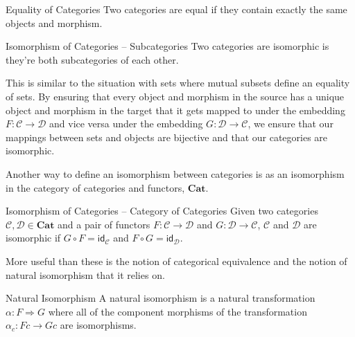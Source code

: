 \documentclass[12pt]{article}
\begin{document}
\begin{definition}{Equality of Categories}{}
    Two categories are equal if they contain exactly the same objects and morphism.
\end{definition}

\begin{definition}{Isomorphism of Categories -- Subcategories}{}
    Two categories are isomorphic is they're both subcategories of each other.
\end{definition}
This is similar to the situation with sets where mutual subsets define an equality of sets.
By ensuring that every object and morphism in the source has a unique object and morphism in the target that it gets mapped to under the embedding $F:\mathcal{C} \rightarrow \mathcal{D}$ and vice versa under the embedding $G:\mathcal{D} \rightarrow \mathcal{C}$,
we ensure that our mappings between sets and objects are bijective and that our categories are isomorphic.

Another way to define an isomorphism between categories is as an isomorphism in the category of categories and functors, $\mathbf{Cat}$.
\begin{definition}{Isomorphism of Categories -- Category of Categories}{}
    Given two categories $\mathcal{C}, \mathcal{D} \in \textbf{Cat}$ and a pair of functors $F:\mathcal{C} \rightarrow \mathcal{D}$ and $G:\mathcal{D} \rightarrow \mathcal{C}$,
    $\mathcal{C}$ and $\mathcal{D}$ are isomorphic if $G \circ F = \mathsf{id_\mathcal{C}}$ and $F \circ G = \mathsf{id_\mathcal{D}}$.
\end{definition}


More useful than these is the notion of categorical equivalence and the notion of natural isomorphism that it relies on.

\begin{definition}{Natural Isomorphism}{}
    A natural isomorphism is a natural transformation $\alpha:F\Rightarrow G$ where all of the component morphisms of the transformation $\alpha_{c}:Fc\rightarrow Gc$ are isomorphisms.
\end{definition}
\end{document}
